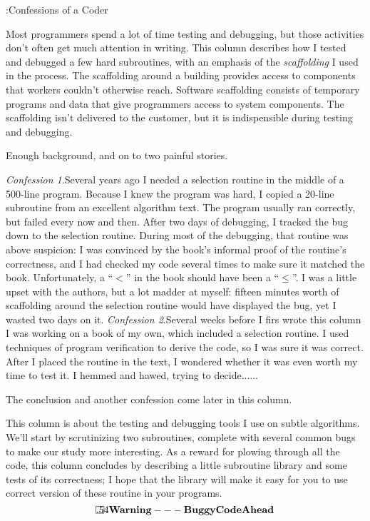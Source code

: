 %



:Confessions of a Coder

\noindent
Most programmers spend a lot of time testing and debugging, but those activities
don't often get much attention in writing. This column describes how I tested
and debugged a few hard subroutines, with an emphasis of the {\it scaffolding\/}
I used in the process. The scaffolding around a building provides access to
components that workers couldn't otherwise reach. Software scaffolding consists
of temporary programs and data that give programmers access to system
components. The scaffolding isn't delivered to the customer, but it is
indispensible during testing and debugging.

Enough background, and on to two painful stories.

\smallskip
\more
{\it Confession 1\/}.\enspace Several years ago I needed a selection routine in
the middle of a 500-line program. Because I knew the program was hard, I copied
a 20-line subroutine from an excellent algorithm text. The program usually
ran correctly, but failed every now and then. After two days of debugging, I
tracked the bug down to the selection routine. During most of the debugging,
that routine was above suspicion: I was convinced by the book's informal proof
of the routine's correctness, and I had checked my code several times to make
sure it matched the book. Unfortunately, a ``$<$'' in the book should have been
a ``$\le$''. I was a little upset with the authors, but a lot madder at myself:
fifteen minutes worth of scaffolding around the selection routine would have
displayed the bug, yet I wasted two days on it.
\smallskip\more
{\it Confession 2\/}.\enspace Several weeks before I firs wrote this column I
was working on a book of my own, which included a selection routine. I used
techniques of program verification to derive the code, so I was sure it
was correct. After I placed the routine in the text, I wondered whether it was
even worth my time to test it. I hemmed and hawed, trying to decide......
\medskip
  
\noindent The conclusion and another confession come later in this column.

This column is about the testing and debugging tools I use on subtle
algorithms. We'll start by scrutinizing two subroutines, complete with several
common bugs to make our study more interesting. As a reward for plowing through
all the code, this column concludes by describing a little subroutine library
and some tests of its correctness; I hope that the library will make it easy
for you to use correct version of these routine in your programs.
$$
\frame{.5}{4}{\bf Warning --- Buggy Code Ahead}
$$

